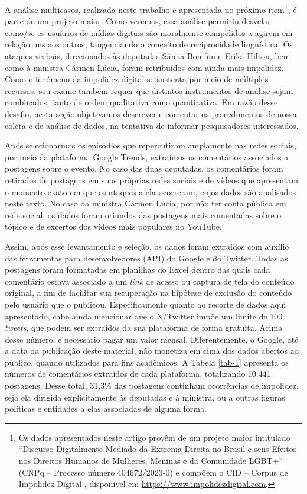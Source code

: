 \documentclass[portuguese]{textolivre}
\begin{document}
A análise multicasos, realizada neste trabalho e apresentada no próximo item\footnote{Os dados apresentados neste artigo provêm de um projeto maior intitulado ``Discurso Digitalmente Mediado da Extrema Direita no Brasil e seus Efeitos nos Direitos Humanos de Mulheres, Meninas e da Comunidade LGBT+'' (CNPq – Processo número 404672/2023-0) e compõem o CID -- Corpus de Impolidez Digital \cite{oliveira2024corpus}, disponível em \url{https://www.impolidezdigital.com}.}, é parte de um projeto maior. Como veremos, essa análise permitiu desvelar como/se os usuários de mídias digitais são moralmente compelidos a agirem em relação uns aos outros, tangenciando o conceito de reciprocidade linguística. Os ataques verbais, direcionados às deputadas Sâmia Bomfim e Erika Hilton, bem como à ministra Cármen Lúcia, foram retribuídos com ainda mais impolidez. Como o fenômeno da impolidez digital se sustenta por meio de múltiplos recursos, seu exame também requer que distintos instrumentos de análise sejam combinados, tanto de ordem qualitativa como quantitativa. Em razão desse desafio, nesta seção objetivamos descrever e comentar os procedimentos de nossa coleta e de análise de dados, na tentativa de informar pesquisadores interessados.

Após selecionarmos os episódios que repercutiram amplamente nas redes sociais, por meio da plataforma Google Trends, extraímos os comentários associados a postagens sobre o evento. No caso das duas deputadas, os comentários foram retirados de postagens em suas próprias redes sociais e de vídeos que apresentam o momento exato em que os ataques a ela ocorreram, cujos dados são analisados neste texto. No caso da ministra Cármen Lúcia, por não ter conta pública em rede social, os dados foram oriundos das postagens mais comentadas sobre o tópico e de excertos dos vídeos mais populares no YouTube.

Assim, após esse levantamento e seleção, os dados foram extraídos com auxílio das ferramentas para desenvolvedores (API) do Google e do Twitter. Todas as postagens foram formatadas em planilhas do Excel dentro das quais cada comentário estava associado a um \textit{link} de acesso ou captura de tela do conteúdo original, a fim de facilitar sua recuperação na hipótese de exclusão do conteúdo pelo usuário que o publicou. Especificamente quanto ao recorte de dados aqui apresentado, cabe ainda mencionar que o X/Twitter impõe um limite de 100 \textit{tweets}, que podem ser extraídos da sua plataforma de forma gratuita. Acima desse número, é necessário pagar um valor mensal. Diferentemente, o Google, até a data da publicação deste material, não monetiza em cima dos dados abertos ao público, quando utilizados para fins acadêmicos. A Tabela \ref{tab-1} apresenta os números de comentários extraídos de cada plataforma, totalizando 10.441 postagens. Desse total, 31,3\% das postagens continham ocorrências de impolidez, seja ela dirigida explicitamente às deputadas e à ministra, ou a outras figuras políticas e entidades a elas associadas de alguma forma.
\end{document}
